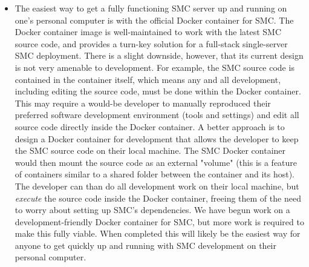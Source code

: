\documentclass{deliverablereport}
\begin{document}
\begin{itemize}
    \item The easiest way to get a fully functioning SMC server up and running
        on one's personal computer is with the official Docker container for
        SMC.
        The Docker container image is well-maintained to work with the latest
        SMC source code, and provides a turn-key solution for a full-stack
        single-server SMC deployment.  There is a slight downside, however,
        that its current design is not very amenable to development.  For
        example, the SMC source code is contained in the container itself,
        which means any and all development, including editing the source code,
        must be done within the Docker container.  This may require a would-be
        developer to manually reproduced their preferred software development
        environment (tools and settings) and edit all source code directly
        inside the Docker container.  A better approach is to design a Docker
        container for development that allows the developer to keep the SMC
        source code on their local machine.  The SMC Docker container would
        then mount the source code as an external "volume" (this is a feature
        of containers similar to a shared folder between the container and its
        host).  The developer can than do all development work on their local
        machine, but \emph{execute} the source code inside the Docker
        container, freeing them of the need to worry about setting up SMC's
        dependencies.  We have begun work on a development-friendly Docker
        container for SMC, but more work is required to make this fully viable.
        When completed this will likely be the easiest way for anyone to get
        quickly up and running with SMC development on their personal computer.

\end{itemize}
\end{document}
